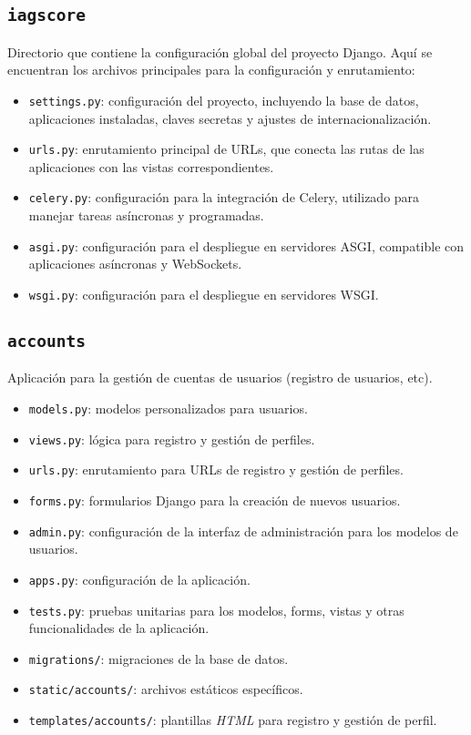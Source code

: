 \subsection{\texttt{iagscore}}
Directorio que contiene la configuración global del proyecto Django. Aquí se encuentran los archivos principales para la configuración y enrutamiento:

\begin{itemize}
    \item \texttt{settings.py}: configuración del proyecto, incluyendo la base de datos, aplicaciones instaladas, claves secretas y ajustes de internacionalización.
    \item \texttt{urls.py}: enrutamiento principal de URLs, que conecta las rutas de las aplicaciones con las vistas correspondientes.
    \item \texttt{celery.py}: configuración para la integración de Celery, utilizado para manejar tareas asíncronas y programadas.
    \item \texttt{asgi.py}: configuración para el despliegue en servidores ASGI, compatible con aplicaciones asíncronas y WebSockets.
    \item \texttt{wsgi.py}: configuración para el despliegue en servidores WSGI.
\end{itemize}

\subsection{\texttt{accounts}}
Aplicación para la gestión de cuentas de usuarios (registro de usuarios, etc).

\begin{itemize}
    \item \texttt{models.py}: modelos personalizados para usuarios.
    \item \texttt{views.py}: lógica para registro y gestión de perfiles.
    \item \texttt{urls.py}: enrutamiento para URLs de registro y gestión de perfiles.
    \item \texttt{forms.py}: formularios Django para la creación de nuevos usuarios.
    \item \texttt{admin.py}: configuración de la interfaz de administración para los modelos de usuarios.
    \item \texttt{apps.py}: configuración de la aplicación.
    \item \texttt{tests.py}: pruebas unitarias para los modelos, forms, vistas y otras funcionalidades de la aplicación.
    \item \texttt{migrations/}: migraciones de la base de datos.
    \item \texttt{static/accounts/}: archivos estáticos específicos.
    \item \texttt{templates/accounts/}: plantillas 	\textit{HTML} para registro y gestión de perfil.
\end{itemize}

